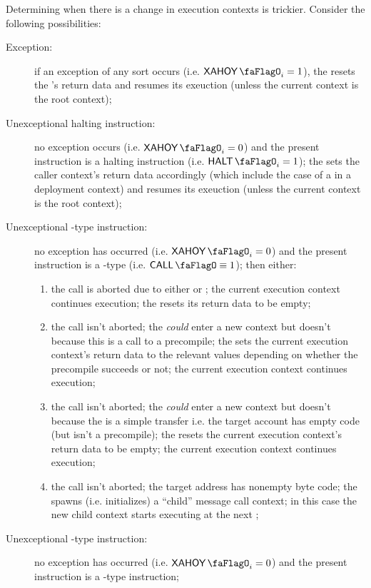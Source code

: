 Determining when there is a change in execution contexts is trickier.
Consider the following possibilities:
\begin{description}
	\item[Exception:]
		if an exception of any sort occurs (i.e. $\xAhoy_{i} = 1$), the \zkEvm{} resets the \caller{}'s return data 
		and resumes its exeuction (unless the current context is the root context);
	\item[Unexceptional halting instruction:]
		no exception occurs (i.e. $\xAhoy_{i} = 0$) and the present instruction is a halting instruction (i.e. $\haltFlag_{i} = 1$);
		the \zkEvm{} sets the caller context's return data accordingly (which include the case of a  in a deployment context)
		and resumes its exeuction (unless the current context is the root context);
	\item[Unexceptional -type instruction:]
		no exception has occurred (i.e. $\xAhoy_{i} = 0$) and the present instruction is a -type (i.e. $\callFlag \equiv 1$);
		then either:
		\begin{enumerate}
			\item
				the call is aborted due to either \balAbortSH{} or \csdAbortSH{};
				the current execution context continues execution;
				the \zkEvm{} resets its return data to be empty;
			\item
				the call isn't aborted;
				the \zkEvm{} \emph{could} enter a new context but doesn't because this is a call to a precompile;
				the \zkEvm{} sets the current execution context's return data to the relevant values depending on whether the precompile succeeds or not;
				the current execution context continues execution;
			\item
				the call isn't aborted;
				the \zkEvm{} \emph{could} enter a new context but doesn't because the  is a simple transfer i.e. the target account has empty code (but isn't a precompile);
				the \zkEvm{} resets the current execution context's return data to be empty;
				the current execution context continues execution;
			\item
				the call isn't aborted;
				the target address has nonempty byte code;
				the \zkEvm{} spawns (i.e. initializes) a ``child'' message call context;
				in this case the new child context starts executing at the next \hubStamp{};
		\end{enumerate}
	\item[Unexceptional -type instruction:]
		no exception has occurred (i.e. $\xAhoy_{i} = 0$) and the present instruction is a -type instruction;

\end{description}
